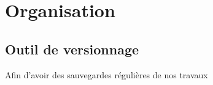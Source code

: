 \chapter{Organisation}

\section{Outil de versionnage}

Afin d'avoir des sauvegardes régulières de nos travaux